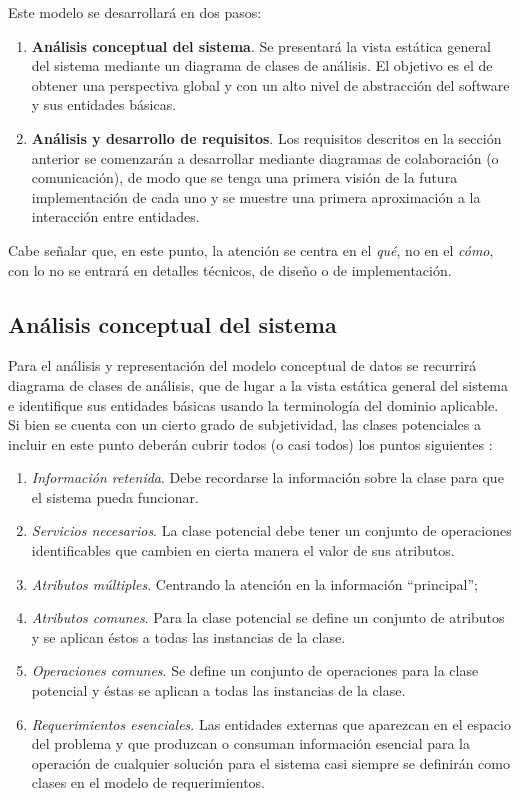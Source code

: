 Este modelo se desarrollará en dos pasos: 

\begin{enumerate}  
	\item \textbf{Análisis conceptual del sistema}. Se presentará la vista estática general del sistema mediante un diagrama de clases de análisis. El objetivo es el de obtener una perspectiva global y con un alto nivel de abstracción del software y sus entidades básicas.
	\item \textbf{Análisis y desarrollo de requisitos}. Los requisitos descritos en la sección anterior se comenzarán a desarrollar mediante diagramas de colaboración (o comunicación), de modo que se tenga una primera visión de la futura implementación de cada uno y se muestre una primera aproximación a la interacción entre entidades.
\end{enumerate}

Cabe señalar que, en este punto, la atención se centra en el \emph{qué}, no en el \emph{cómo}, con lo no se entrará en detalles técnicos, de diseño o de implementación.

\subsection{Análisis conceptual del sistema}

Para el análisis y representación del modelo conceptual de datos se recurrirá diagrama de clases de análisis, que de lugar a la vista estática general del sistema e identifique sus entidades básicas usando la terminología del dominio aplicable. Si bien se cuenta con un cierto grado de subjetividad, las clases potenciales a incluir en este punto deberán cubrir todos (o casi todos) los puntos siguientes \cite{Coa91}:

\begin{enumerate}  
	\item \textit{Información retenida}. Debe recordarse la información sobre la clase para que el sistema pueda funcionar.
	\item \textit{Servicios necesarios}. La clase potencial debe tener un conjunto de operaciones identificables que cambien en cierta manera el valor de sus atributos.
	\item \textit{Atributos múltiples}. Centrando la atención en la información “principal”;
	\item \textit{Atributos comunes}. Para la clase potencial se define un conjunto de atributos y se aplican éstos a todas las instancias de la clase.
	\item \textit{Operaciones comunes}. Se define un conjunto de operaciones para la clase potencial y éstas se aplican a todas las instancias de la clase.
	\item \textit{Requerimientos esenciales}. Las entidades externas que aparezcan en el espacio del problema y que produzcan o consuman información esencial para la operación de cualquier solución para el sistema casi siempre se definirán como clases en el modelo de requerimientos.	
\end{enumerate}

